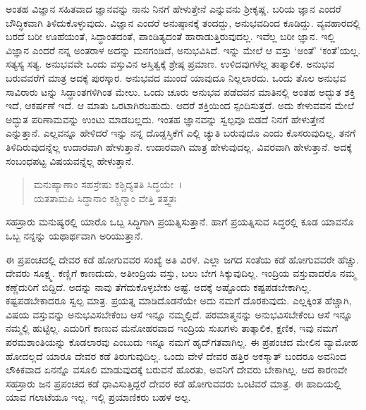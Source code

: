 ಅಂತಹ ವಿಜ್ಞಾನ ಸಹಿತವಾದ ಜ್ಞಾನವನ್ನು ನಾನು ನಿನಗೆ ಹೇಳುತ್ತೇನೆ ಎನ್ನುವನು ಶ‍್ರೀಕೃಷ್ಣ. ಬರಿಯ ಜ್ಞಾನ ಎಂದರೆ ಬೌದ್ಧಿಕವಾಗಿ ತಿಳಿದುಕೊಳ್ಳುವುದು. ವಿಜ್ಞಾನ ಎಂದರೆ ಅನುಷ್ಠಾನಕ್ಕೆ ತಂದದ್ದು, ಅನುಭವದಿಂದ ಕೂಡಿದ್ದು. ವ್ಯವಹಾರದಲ್ಲಿ ಬರದೆ ಬರೀ ಊಹೆಯಂತೆ, ಸಿದ್ಧಾಂತದಂತೆ, ಪಾಂಡಿತ್ಯದಂತೆ ಹಾರಾಡುತ್ತಿರುವುದಲ್ಲ. ಇವೆಲ್ಲ ಬರೀ ಜ್ಞಾನ. ಇಲ್ಲಿ ವಿಜ್ಞಾನ ಎಂದರೆ ನನ್ನ ಅಂತರಾಳ ಅದನ್ನು ಮನಗಂಡಿದೆ, ಅನುಭವಿಸಿದೆ. ಇನ್ನು ಮೇಲೆ ಆ ವಸ್ತು ‘ಅಂತೆ’ ‘ಕಂತೆ’ಯಲ್ಲ. ಸತ್ಯಸ್ಯ ಸತ್ಯ. ಅನುಭವವೇ ಒಂದು ವಸ್ತುವಿನ ಅಸ್ತಿತ್ವಕ್ಕೆ ಶ್ರೇಷ್ಠ ಪ್ರಮಾಣ. ಉಳಿದವುಗಳೆಲ್ಲ ತಾತ್ಕಾಲಿಕ. ಅನುಭವ ಬರುವವರೆಗೆ ಮಾತ್ರ ಅದಕ್ಕೆ ಪುರಸ್ಕಾರ. ಅನುಭವದ ಮುಂದೆ ಯಾವುದೂ ನಿಲ್ಲಲಾರದು. ಒಂದು ತೊಲ ಅನುಭವ ಸಾವಿರಾರು ಟನ್ನು ಸಿದ್ಧಾಂತಗಳಿಗಿಂತ ಮೇಲು. ಒಂದು ಚೂರು ಅನುಭವ ಪಡೆದವನ ಮಾತಿನಲ್ಲಿ ಅಂತಹ ಅದ್ಭುತ ಶಕ್ತಿ ಇದೆ, ಆಕರ್ಷಣೆ ಇದೆ. ಆ ಮಾತು ಒರಟಾಗಿರಬಹುದು. ಆದರೆ ಶಕ್ತಿಯಿಂದ ಸ್ಪಂದಿಸುತ್ತದೆ. ಅದು ಕೇಳುವವನ ಮೇಲೆ ಅದ್ಭುತ ಪರಿಣಾಮವನ್ನು ಉಂಟು ಮಾಡಬಲ್ಲದು. ಇಂತಹ ಜ್ಞಾನವನ್ನು ಸ್ವಲ್ಪವೂ ಬಿಡದೆ ನಿನಗೆ ಹೇಳುತ್ತೇನೆ ಎನ್ನುತ್ತಾನೆ. ಎಲ್ಲವನ್ನೂ ಹೇಳಿದರೆ ಇನ್ನು ನನ್ನ ದೊಡ್ಡಸ್ತಿಕೆಗೆ ಎಲ್ಲಿ ಚ್ಯುತಿ ಬರುವುದೊ ಎಂದು ಕೊಸರುವುದಿಲ್ಲ. ತನಗೆ ತಿಳಿದಿರುವುದನ್ನೆಲ್ಲ ಉದಾರವಾಗಿ ಹೇಳುತ್ತಾನೆ. ಉದಾರವಾಗಿ ಮಾತ್ರ ಹೇಳುವುದಲ್ಲ. ವಿವರವಾಗಿ ಹೇಳುತ್ತಾನೆ. ಅದಕ್ಕೆ ಸಂಬಂಧಪಟ್ಟ ವಿಷಯವನ್ನೆಲ್ಲ ಹೇಳುತ್ತಾನೆ.

\begin{verse}
ಮನುಷ್ಯಾಣಾಂ ಸಹಸ್ರೇಷು ಕಶ್ಚಿದ್ಯತತಿ ಸಿದ್ಧಯೇ~।\\ಯತತಾಮಪಿ ಸಿದ್ಧಾನಾಂ ಕಶ್ಚಿನ್ಮಾಂ ವೇತ್ತಿ ತತ್ತ್ವತಃ 
\end{verse}

{\small ಸಹಸ್ರಾರು ಮನುಷ್ಯರಲ್ಲಿ ಯಾರೊ ಒಬ್ಬ ಸಿದ್ಧಿಗಾಗಿ ಪ್ರಯತ್ನಿಸುತ್ತಾನೆ. ಹಾಗೆ ಪ್ರಯತ್ನಿಸುವ ಸಿದ್ಧರಲ್ಲಿ ಕೂಡ ಯಾವನೊ ಒಬ್ಬ ನನ್ನನ್ನು ಯಥಾರ್ಥವಾಗಿ ಅರಿಯುತ್ತಾನೆ.}

ಈ ಪ್ರಪಂಚದಲ್ಲಿ ದೇವರ ಕಡೆ ಹೋಗುವವರ ಸಂಖ್ಯೆ ಅತಿ ವಿರಳ. ಎಲ್ಲಾ ಜಗದ ಸಂತೆಯ ಕಡೆ ಹೋಗುವವರೇ ಹೆಚ್ಚು. ದೇವರು ಸೂಕ್ಷ್ಮ. ಕಣ್ಣಿಗೆ ಕಾಣದುದು, ಅತೀಂದ್ರಿಯ ವಸ್ತು, ಬಲು ಬೇಗ ಸಿಕ್ಕುವುದಿಲ್ಲ. ಇಂದ್ರಿಯ ವಸ್ತುವಾದರೊ ನಮ್ಮ ಕಣ್ಣೆದುರಿಗೆ ಬಿದ್ದಿದೆ. ಅದನ್ನು ನಾವು ತೆಗೆದುಕೊಳ್ಳಬೇಕು ಅಷ್ಟೆ. ಅದಕ್ಕೆ ಅಷ್ಟೊಂದು ಕಷ್ಟಪಡಬೇಕಾಗಿಲ್ಲ. ಕಷ್ಟಪಡಬೇಕಾದರೂ ಸ್ವಲ್ಪ ಮಾತ್ರ. ಪ್ರಯತ್ನ ಮಾಡಿದೊಡನೆಯೇ ಅದು ನಮಗೆ ದೊರಕುವುದು. ಎಲ್ಲಕ್ಕಿಂತ ಹೆಚ್ಚಾಗಿ, ವಿಷಯ ವಸ್ತುವನ್ನು ಅನುಭವಿಸಬೇಕೆಂಬ ಆಸೆ ಇನ್ನೂ ನಮ್ಮಲ್ಲಿದೆ. ಪರಮಾತ್ಮನನ್ನು ಅನುಭವಿಸಬೇಕೆಂಬ ಆಸೆ ಇನ್ನೂ ನಮ್ಮಲ್ಲಿ ಹುಟ್ಟಿಲ್ಲ. ಎದುರಿಗೆ ಕಾಣುವ ಮನೋಹರವಾದ ಇಂದ್ರಿಯ ಸುಖಗಳು ತಾತ್ಕಾಲಿಕ, ಕ್ಷಣಿಕ, ಇವು ನಮಗೆ ಪರಮಶಾಂತಿಯನ್ನು ಕೊಡಲಾರವು ಎಂಬುದು ಇನ್ನೂ ನಮಗೆ ಹೃದ್​ಗತವಾಗಿಲ್ಲ. ಈ ಪ್ರಪಂಚದ ಮೇಲಿನ ವ್ಯಾಮೋಹ ಹೋದಲ್ಲದೆ ಯಾರೂ ದೇವರ ಕಡೆ ತಿರುಗುವುದಿಲ್ಲ. ಒಂದು ವೇಳೆ ದೇವರ ಹತ್ತಿರ ಅಕಸ್ಮಾತ್ ಬಂದರೂ ಅವನಿಂದ ಲೌಕಿಕವಾದ ಏನನ್ನೊ ವಸೂಲಿ ಮಾಡುವುದಕ್ಕೆ ಬರುವನೆ ಹೊರತು, ಅವನಿಗೆ ದೇವರು ಬೇಕಾಗಿಲ್ಲ. ಆದ ಕಾರಣವೇ ಸಹಸ್ರಾರು ಜನ ಪ್ರಪಂಚದ ಕಡೆ ಧಾವಿಸುತ್ತಿದ್ದರೆ ದೇವರ ಕಡೆ ಹೋಗುವವರು ಒಂಟಿವರೆ ಮಾತ್ರ. ಈ ಹಾದಿಯಲ್ಲಿ ಯಾವ ಗಲಾಟೆಯೂ ಇಲ್ಲ. ಇಲ್ಲಿ ಪ್ರಯಾಣಿಕರು ಬಹಳ ಅಲ್ಪ.


